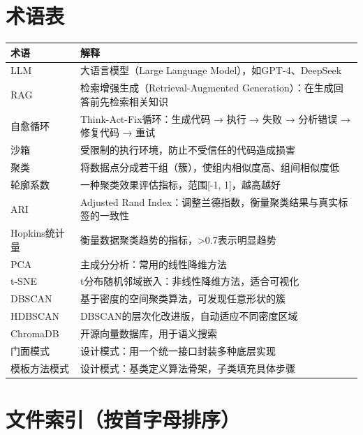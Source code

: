 \documentclass[11pt,a4paper]{ctexbook}
\begin{document}
\chapter{术语表}

\begin{longtable}{p{3cm} p{10cm}}
    \toprule
    \textbf{术语} & \textbf{解释} \\
    \midrule
    LLM & 大语言模型（Large Language Model），如GPT-4、DeepSeek \\
    \midrule
    RAG & 检索增强生成（Retrieval-Augmented Generation）：在生成回答前先检索相关知识 \\
    \midrule
    自愈循环 & Think-Act-Fix循环：生成代码 → 执行 → 失败 → 分析错误 → 修复代码 → 重试 \\
    \midrule
    沙箱 & 受限制的执行环境，防止不受信任的代码造成损害 \\
    \midrule
    聚类 & 将数据点分成若干组（簇），使组内相似度高、组间相似度低 \\
    \midrule
    轮廓系数 & 一种聚类效果评估指标，范围[-1, 1]，越高越好 \\
    \midrule
    ARI & Adjusted Rand Index：调整兰德指数，衡量聚类结果与真实标签的一致性 \\
    \midrule
    Hopkins统计量 & 衡量数据聚类趋势的指标，>0.7表示明显趋势 \\
    \midrule
    PCA & 主成分分析：常用的线性降维方法 \\
    \midrule
    t-SNE & t分布随机邻域嵌入：非线性降维方法，适合可视化 \\
    \midrule
    DBSCAN & 基于密度的空间聚类算法，可发现任意形状的簇 \\
    \midrule
    HDBSCAN & DBSCAN的层次化改进版，自动适应不同密度区域 \\
    \midrule
    ChromaDB & 开源向量数据库，用于语义搜索 \\
    \midrule
    门面模式 & 设计模式：用一个统一接口封装多种底层实现 \\
    \midrule
    模板方法模式 & 设计模式：基类定义算法骨架，子类填充具体步骤 \\
    \bottomrule
\end{longtable}

\chapter{文件索引（按首字母排序）}
\end{document}
